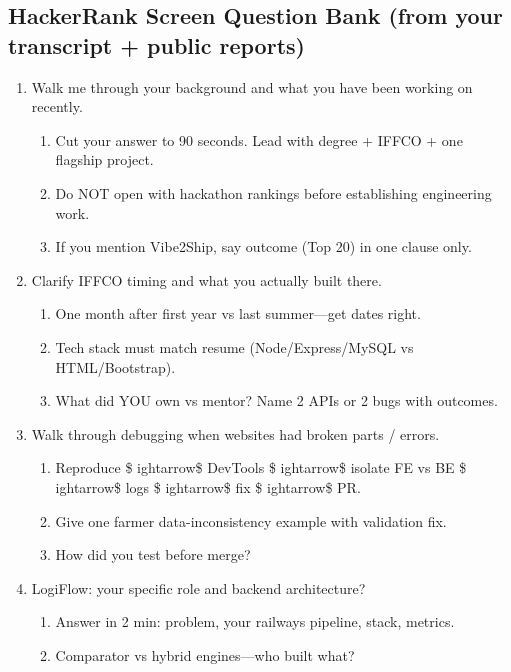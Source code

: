 \documentclass[9pt,a4paper]{article}
\begin{document}
\subsection{HackerRank Screen Question Bank (from your transcript + public reports)}
\begin{enumerate}[label=\textbf{Q\arabic*:}, leftmargin=*]
  \item Walk me through your background and what you have been working on recently.
  \begin{enumerate}[label=\textit{FU\arabic*:}, leftmargin=2em]
    \item Cut your answer to 90 seconds. Lead with degree + IFFCO + one flagship project.
    \item Do NOT open with hackathon rankings before establishing engineering work.
    \item If you mention Vibe2Ship, say outcome (Top 20) in one clause only.
  \end{enumerate}
  \item Clarify IFFCO timing and what you actually built there.
  \begin{enumerate}[label=\textit{FU\arabic*:}, leftmargin=2em]
    \item One month after first year vs last summer---get dates right.
    \item Tech stack must match resume (Node/Express/MySQL vs HTML/Bootstrap).
    \item What did YOU own vs mentor? Name 2 APIs or 2 bugs with outcomes.
  \end{enumerate}
  \item Walk through debugging when websites had broken parts / errors.
  \begin{enumerate}[label=\textit{FU\arabic*:}, leftmargin=2em]
    \item Reproduce \$
ightarrow\$ DevTools \$
ightarrow\$ isolate FE vs BE \$
ightarrow\$ logs \$
ightarrow\$ fix \$
ightarrow\$ PR.
    \item Give one farmer data-inconsistency example with validation fix.
    \item How did you test before merge?
  \end{enumerate}
  \item LogiFlow: your specific role and backend architecture?
  \begin{enumerate}[label=\textit{FU\arabic*:}, leftmargin=2em]
    \item Answer in 2 min: problem, your railways pipeline, stack, metrics.
    \item Comparator vs hybrid engines---who built what?

\end{enumerate}
\end{enumerate}
\end{document}
